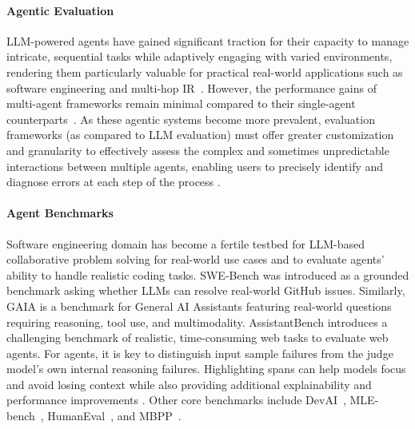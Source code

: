 
\paragraph{Agentic Evaluation}

LLM-powered agents have gained significant traction for their capacity to manage intricate, sequential tasks while adaptively engaging with varied environments, rendering them particularly valuable for practical real-world applications such as software engineering and multi-hop IR~\cite{ma2023laser, OpenAI2024DeepResearch, nguyen2024dynasaur, wang2025browsing, jimenez2024swebench, qian2023chatdev, openhands, patil2024gorilla}. However, the performance gains of multi-agent frameworks remain minimal compared to their single-agent counterparts~\cite{xia2024agentless, kapoor2024agents}. As these agentic systems become more prevalent, evaluation frameworks (as compared to LLM evaluation) must offer greater customization and granularity to effectively assess the complex and sometimes unpredictable interactions between multiple agents, enabling users to precisely identify and diagnose errors at each step of the process \cite{roy2024llmrca, akhtar2025llm, jiang2025l4, zhuge2024agent, openmanusrl2024}.

\paragraph{Agent Benchmarks} 

Software engineering domain has become a fertile testbed for LLM-based collaborative problem solving for real-world use cases and to evaluate agents' ability to handle realistic coding tasks. SWE-Bench \cite{jimenez2024swebench, aleithan2024swebenchplus, pan2024swegym} was introduced as a grounded benchmark asking whether LLMs can resolve real-world GitHub issues.  
Similarly, GAIA \cite{mialon2023gaia} is a benchmark for General AI Assistants featuring real-world questions requiring reasoning, tool use, and multimodality. AssistantBench \cite{yoran-etal-2024-assistantbench} introduces a challenging benchmark of realistic, time-consuming web tasks to evaluate web agents. For agents, it is key to distinguish input sample failures from the judge model’s own internal reasoning failures. Highlighting spans can help models focus and avoid losing context while also providing additional explainability and performance improvements \cite{lv2024coarse, li-etal-2024-spotting}. Other core benchmarks include DevAI~\cite{zhuge2024agent}, MLE-bench~\cite{Chan2024MLEbenchEM}, HumanEval~\cite{du2024humaneval}, and MBPP~\cite{odena2021MBPP}. 

